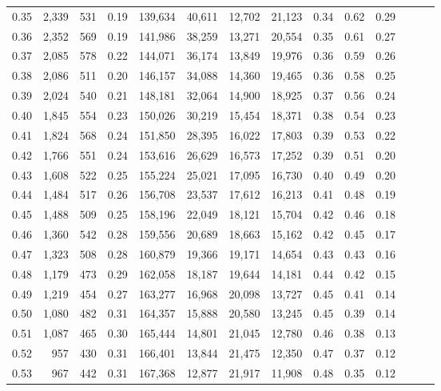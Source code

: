 \begin{tabular}{rrrrrrrrrrrrrr}
0.35 &  2,339 &  531 &  0.19 &  139,634 &   40,611 &  12,702 &  21,123 &  0.34 &  0.62 &      0.29 \\
0.36 &  2,352 &  569 &  0.19 &  141,986 &   38,259 &  13,271 &  20,554 &  0.35 &  0.61 &      0.27 \\
0.37 &  2,085 &  578 &  0.22 &  144,071 &   36,174 &  13,849 &  19,976 &  0.36 &  0.59 &      0.26 \\
0.38 &  2,086 &  511 &  0.20 &  146,157 &   34,088 &  14,360 &  19,465 &  0.36 &  0.58 &      0.25 \\
0.39 &  2,024 &  540 &  0.21 &  148,181 &   32,064 &  14,900 &  18,925 &  0.37 &  0.56 &      0.24 \\
0.40 &  1,845 &  554 &  0.23 &  150,026 &   30,219 &  15,454 &  18,371 &  0.38 &  0.54 &      0.23 \\
0.41 &  1,824 &  568 &  0.24 &  151,850 &   28,395 &  16,022 &  17,803 &  0.39 &  0.53 &      0.22 \\
0.42 &  1,766 &  551 &  0.24 &  153,616 &   26,629 &  16,573 &  17,252 &  0.39 &  0.51 &      0.20 \\
0.43 &  1,608 &  522 &  0.25 &  155,224 &   25,021 &  17,095 &  16,730 &  0.40 &  0.49 &      0.20 \\
0.44 &  1,484 &  517 &  0.26 &  156,708 &   23,537 &  17,612 &  16,213 &  0.41 &  0.48 &      0.19 \\
0.45 &  1,488 &  509 &  0.25 &  158,196 &   22,049 &  18,121 &  15,704 &  0.42 &  0.46 &      0.18 \\
0.46 &  1,360 &  542 &  0.28 &  159,556 &   20,689 &  18,663 &  15,162 &  0.42 &  0.45 &      0.17 \\
0.47 &  1,323 &  508 &  0.28 &  160,879 &   19,366 &  19,171 &  14,654 &  0.43 &  0.43 &      0.16 \\
0.48 &  1,179 &  473 &  0.29 &  162,058 &   18,187 &  19,644 &  14,181 &  0.44 &  0.42 &      0.15 \\
0.49 &  1,219 &  454 &  0.27 &  163,277 &   16,968 &  20,098 &  13,727 &  0.45 &  0.41 &      0.14 \\
0.50 &  1,080 &  482 &  0.31 &  164,357 &   15,888 &  20,580 &  13,245 &  0.45 &  0.39 &      0.14 \\
0.51 &  1,087 &  465 &  0.30 &  165,444 &   14,801 &  21,045 &  12,780 &  0.46 &  0.38 &      0.13 \\
0.52 &    957 &  430 &  0.31 &  166,401 &   13,844 &  21,475 &  12,350 &  0.47 &  0.37 &      0.12 \\
0.53 &    967 &  442 &  0.31 &  167,368 &   12,877 &  21,917 &  11,908 &  0.48 &  0.35 &      0.12 \\

\end{tabular}
